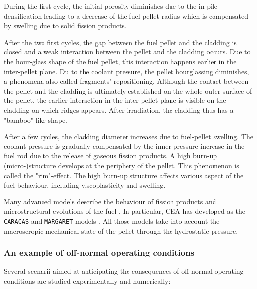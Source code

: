 During the first cycle, the initial porosity diminishes due to the
in-pile densification leading to a decrease of the fuel pellet radius
which is compensated by swelling due to solid fission products.

After the two first cycles, the gap between the fuel pellet and the
cladding is closed and a weak interaction between the pellet and the
cladding occurs. Due to the hour-glass shape of the fuel pellet, this
interaction happens earlier in the inter-pellet plane. Du to the coolant
pressure, the pellet hourglassing diminishes, a phenomena also called
fragments' repositioning. Although the contact between the pellet and
the cladding is ultimately established on the whole outer surface of the
pellet, the earlier interaction in the inter-pellet plane is visible on
the cladding on which ridges appears. After irradiation, the cladding
thus has a "bamboo"-like shape.

After a few cycles, the cladding diameter increases due to fuel-pellet
swelling. The coolant pressure is gradually compensated by the inner
pressure increase in the fuel rod due to the release of gaseous fission
products. A high burn-up (micro-)structure develops at the periphery of
the pellet. This phenomenon is called the "rim"-effect. The high burn-up
structure affects various aspect of the fuel behaviour, including
viscoplasticity and swelling.

Many advanced models describe the behaviour of fission products and
microstructural evolutions of the fuel \cite{pizzocri_sciantix_2020}. In
particular, CEA has developed as the \texttt{CARACAS} \cite{boulore_approach_2017}
and \texttt{MARGARET} models \cite{noirot_margaret_2011}. All those models take
into account the macroscropic mechanical state of the pellet through the
hydrostatic pressure.

\subsubsection{An example of off-normal operating conditions}
\label{sec_off_normal_operating_conditions}

Several scenarii aimed at anticipating the consequences of off-normal
operating conditions are studied experimentally and numerically:

